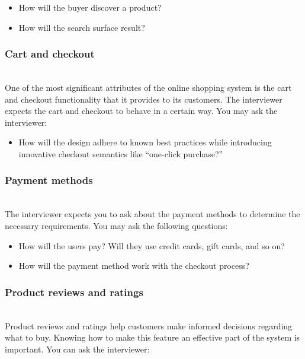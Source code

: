 \begin{itemize}
\item
\protect{}\label{46HTIPR8lLlJW1bU6wwZx}
How will the buyer discover a product?
\item
\protect{}\label{0w7LQK4xRHJ7mp_JHAWpi}
How will the search surface result?
\end{itemize}

\subsubsection{Cart and checkout}\label{h7dhGrCg3emlXZdoxSxHq}
\\
One of the most significant attributes of the online shopping system is the cart and checkout functionality that it provides to its customers. The interviewer expects the cart and checkout to behave in a certain way. You may ask the interviewer:

\begin{itemize}
\item
\protect{}\label{q7KslQ3wL0UZYKsZX5XhM}
How will the design adhere to known best practices while introducing innovative checkout semantics like ``one-click purchase?''
\end{itemize}

\subsubsection{Payment methods}\label{-6IWSlTeYFphYQRYW5G1s}
\\
The interviewer expects you to ask about the payment methods to determine the necessary requirements. You may ask the following questions:

\begin{itemize}
\item
\protect{}\label{VeLJQD2phbMB1aIuQv6l3}
How will the users pay? Will they use credit cards, gift cards, and so on?
\item
\protect{}\label{MWYYabAo3FcfAavfau_UA}
How will the payment method work with the checkout process?
\end{itemize}

\subsubsection{Product reviews and ratings}\label{DZg0KiDQHri0Yq9Pl8uC-}
\\
Product reviews and ratings help customers make informed decisions regarding what to buy. Knowing how to make this feature an effective part of the system is important. You can ask the interviewer:


